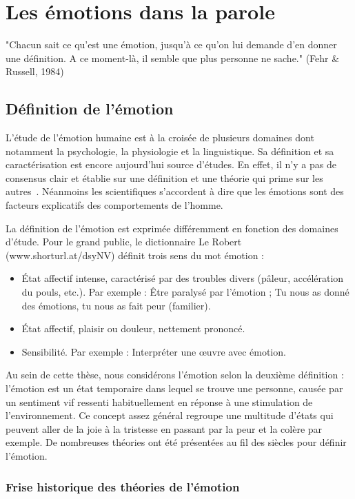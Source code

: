 \clearemptydoublepage

\chapter{Les émotions dans la parole}
"Chacun sait ce qu’est une émotion, jusqu’à ce qu’on lui demande d’en donner une définition. A ce moment-là, il semble que plus personne ne sache." (Fehr \& Russell, 1984)

 \section{Définition de l'émotion}
L'étude de l'émotion humaine est à la croisée de plusieurs domaines dont notamment la psychologie, la physiologie et la linguistique. Sa définition et sa caractérisation est encore aujourd'hui source d'études. En effet, il n'y a pas de consensus clair et établie sur une définition et une théorie qui prime sur les autres~\cite{Kleinginna1981,Strongman1996}. Néanmoins les scientifiques s'accordent à dire que les émotions sont des facteurs explicatifs des comportements de l'homme.

La définition de l'émotion est exprimée différemment en fonction des domaines d'étude. Pour le grand public, le dictionnaire Le Robert (www.shorturl.at/dsyNV) définit trois sens du mot émotion :
\begin{itemize}
    \item État affectif intense, caractérisé par des troubles divers (pâleur, accélération du pouls, etc.). Par exemple : Être paralysé par l'émotion ; Tu nous as donné des émotions, tu nous as fait peur (familier).
    \item État affectif, plaisir ou douleur, nettement prononcé.
    \item Sensibilité. Par exemple : Interpréter une œuvre avec émotion.
\end{itemize}
Au sein de cette thèse, nous considérons l'émotion selon la deuxième définition : l'émotion est un état temporaire dans lequel se trouve une personne, causée par un sentiment vif ressenti habituellement en réponse à une stimulation de l'environnement. Ce concept assez général regroupe une multitude d'états qui peuvent aller de la joie à la tristesse en passant par la peur et la colère par exemple. De nombreuses théories ont été présentées au fil des siècles pour définir l'émotion.

\subsection{Frise historique des théories de l'émotion}


